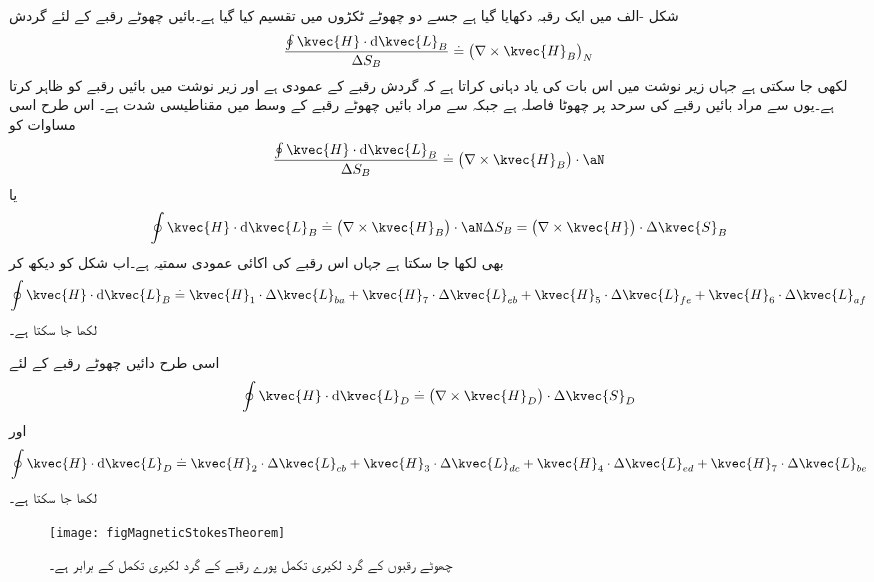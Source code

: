 شکل -الف میں ایک رقبہ دکھایا گیا ہے جسے دو چھوٹے ٹکڑوں میں تقسیم کیا گیا ہے۔بائیں چھوٹے رقبے کے لئے گردش
\begin{align*}
\frac{\oint \kvec{H} \cdot \dif \kvec{L}_B}{\Delta S_B} \overset{.}{=} \left(\nabla \times \kvec{H}_B \right)_N
\end{align*}
لکھی جا سکتی ہے جہاں زیر نوشت میں  اس بات کی یاد دہانی کراتا ہے کہ گردش رقبے  کے عمودی ہے اور زیر نوشت میں  بائیں رقبے کو ظاہر کرتا ہے۔یوں  سے مراد بائیں رقبے کی       سرحد پر چھوٹا فاصلہ ہے جبکہ  سے مراد بائیں چھوٹے رقبے کے وسط میں مقناطیسی شدت ہے۔ اس طرح اسی مساوات  کو
\begin{align*}
\frac{\oint \kvec{H} \cdot \dif \kvec{L}_B}{\Delta S_B} \overset{.}{=} \left(\nabla \times \kvec{H}_B \right) \cdot \aN
\end{align*}
یا
\begin{align*}
\oint \kvec{H} \cdot \dif \kvec{L}_B\overset{.}{=} \left(\nabla \times \kvec{H}_B \right) \cdot \aN \Delta S_B=\left(\nabla \times \kvec{H} \right) \cdot  \Delta \kvec{S}_B
\end{align*}
بھی لکھا جا سکتا ہے جہاں  اس رقبے کی اکائی عمودی سمتیہ ہے۔اب شکل کو دیکھ کر
\begin{align*}
\oint \kvec{H} \cdot \dif \kvec{L}_B\overset{.}{=} \kvec{H}_1 \cdot \Delta \kvec{L}_{ba}+ \kvec{H}_7 \cdot \Delta\kvec{L}_{eb}+ \kvec{H}_5 \cdot \Delta \kvec{L}_{fe}+ \kvec{H}_6 \cdot \Delta \kvec{L}_{af}
\end{align*}
لکھا جا سکتا ہے۔ 

اسی طرح دائیں چھوٹے رقبے کے لئے
\begin{align*}
\oint \kvec{H} \cdot \dif \kvec{L}_D\overset{.}{=}\left(\nabla \times \kvec{H}_D \right) \cdot  \Delta \kvec{S}_D
\end{align*}
اور
\begin{align*}
\oint \kvec{H} \cdot \dif \kvec{L}_D\overset{.}{=} \kvec{H}_2 \cdot \Delta\kvec{L}_{cb}+ \kvec{H}_3 \cdot \Delta\kvec{L}_{dc}+ \kvec{H}_4 \cdot \Delta\kvec{L}_{ed}+ \kvec{H}_7 \cdot \Delta\kvec{L}_{be}
\end{align*}
لکھا جا سکتا ہے۔

\begin{figure}
\centering
\texttt{[image: figMagneticStokesTheorem]}
\caption{چھوٹے رقبوں کے گرد لکیری تکمل پورے رقبے کے گرد لکیری تکمل کے برابر ہے۔}
\label{شکل_مقناطیسی_مسئلہ_سٹوکس}
\end{figure}


